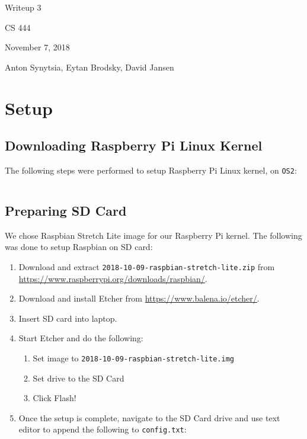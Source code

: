 \documentclass[onecolumn, draftclsnofoot, 10pt]{IEEEtran}
\begin{document}
\begin{titlepage}
\begin{singlespace}
\centering
\scshape{
    \huge{Writeup 3}\par
    \vspace{.5in}
    \large{CS 444}\par
    \large{November 7, 2018}\par
    \vspace{.5in}
    \large{Anton Synytsia, Eytan Brodsky, David Jansen}\par
    \vspace{.5in}
    \vfill
}
\end{singlespace}
\end{titlepage}
\newpage
{}
\tableofcontents
\clearpage

\section{Setup}

\subsection{Downloading Raspberry Pi Linux Kernel}
The following steps were performed to setup Raspberry Pi Linux kernel, on \texttt{OS2}:
\inputminted[breaklines]{bash}{cs1.sh}


\subsection{Preparing SD Card}
We chose Raspbian Stretch Lite image for our Raspberry Pi kernel. The following was done to setup Raspbian on SD card:
\begin{enumerate}
\item Download and extract \texttt{2018-10-09-raspbian-stretch-lite.zip} from \url{https://www.raspberrypi.org/downloads/raspbian/}.
\item Download and install Etcher from \url{https://www.balena.io/etcher/}.
\item Insert SD card into laptop.
\item Start Etcher and do the following:
    \begin{enumerate}
    \item Set image to \texttt{2018-10-09-raspbian-stretch-lite.img}
    \item Set drive to the SD Card
    \item Click \doublequote Flash!\doublequote
    \end{enumerate}
\item Once the setup is complete, navigate to the SD Card drive and use text editor to append the following to \texttt{config.txt}:
\inputminted[breaklines]{bash}{cs2.sh}
\end{enumerate}
\end{document}
